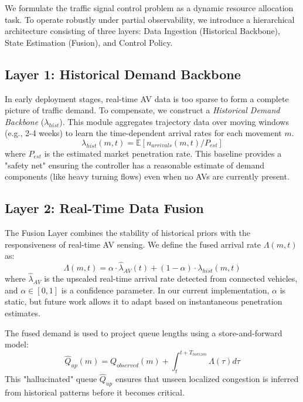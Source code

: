 \documentclass[conference]{IEEEtran}
\begin{document}
We formulate the traffic signal control problem as a dynamic resource allocation task. To operate robustly under partial observability, we introduce a hierarchical architecture consisting of three layers: Data Ingestion (Historical Backbone), State Estimation (Fusion), and Control Policy.




\subsection{Layer 1: Historical Demand Backbone}
In early deployment stages, real-time AV data is too sparse to form a complete picture of traffic demand. To compensate, we construct a \textit{Historical Demand Backbone} ($\lambda_{hist}$). This module aggregates trajectory data over moving windows (e.g., 2-4 weeks) to learn the time-dependent arrival rates for each movement $m$.
\begin{equation}
    \lambda_{hist}(m, t) = \mathbb{E}[n_{arrivals}(m, t) / P_{est}]
\end{equation}
where $P_{est}$ is the estimated market penetration rate. This baseline provides a "safety net" ensuring the controller has a reasonable estimate of demand components (like heavy turning flows) even when no AVs are currently present.

\subsection{Layer 2: Real-Time Data Fusion}
The Fusion Layer combines the stability of historical priors with the responsiveness of real-time AV sensing. We define the fused arrival rate $\Lambda(m, t)$ as:
\begin{equation}
    \Lambda(m, t) = \alpha \cdot \hat{\lambda}_{AV}(t) + (1-\alpha) \cdot \lambda_{hist}(m, t)
\end{equation}
where $\hat{\lambda}_{AV}$ is the upscaled real-time arrival rate detected from connected vehicles, and $\alpha \in [0, 1]$ is a confidence parameter. In our current implementation, $\alpha$ is static, but future work allows it to adapt based on instantaneous penetration estimates. 

The fused demand is used to project queue lengths using a store-and-forward model:
\begin{equation}
    \hat{Q}_{up}(m) = Q_{observed}(m) + \int_{t}^{t+T_{horizon}} \Lambda(\tau) d\tau
\end{equation}
This "hallucinated" queue $\hat{Q}_{up}$ ensures that unseen localized congestion is inferred from historical patterns before it becomes critical.
\end{document}
